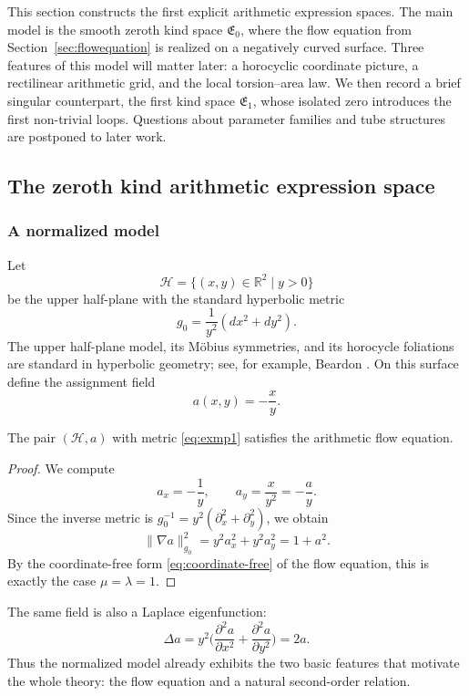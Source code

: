 This section constructs the first explicit arithmetic expression spaces. The main model is the smooth zeroth kind space $\mathfrak{E}_0$, where the flow equation from Section~\ref{sec:flowequation} is realized on a negatively curved surface. Three features of this model will matter later: a horocyclic coordinate picture, a rectilinear arithmetic grid, and the local torsion--area law. We then record a brief singular counterpart, the first kind space $\mathfrak{E}_1$, whose isolated zero introduces the first non-trivial loops. Questions about parameter families and tube structures are postponed to later work.

\subsection{The zeroth kind arithmetic expression space}\label{subsec:motivexamples}\label{subsec:generalframework}

\subsubsection{A normalized model}

Let
\[
\mathcal H = \{(x,y)\in\mathbb R^2\mid y>0\}
\]
be the upper half-plane with the standard hyperbolic metric
\begin{equation}\label{eq:exmp1}
    g_0 = \frac{1}{y^2}(dx^2+dy^2).
\end{equation}
The upper half-plane model, its Möbius symmetries, and its horocycle foliations are standard in hyperbolic geometry; see, for example, Beardon \cite{Beardon1983DiscreteGroups}. On this surface define the assignment field
\[
    a(x,y) = -\frac{x}{y}.
\]

\begin{proposition}\label{thm:exmp1}
The pair $(\mathcal H,a)$ with metric \eqref{eq:exmp1} satisfies the arithmetic flow equation.
\end{proposition}

\begin{proof}
We compute
\[
    a_x = -\frac{1}{y},
    \qquad
    a_y = \frac{x}{y^2} = -\frac{a}{y}.
\]
Since the inverse metric is $g_0^{-1}=y^2(\partial_x^2+\partial_y^2)$, we obtain
\[
    \|\nabla a\|_{g_0}^2
    = y^2 a_x^2 + y^2 a_y^2
    = 1 + a^2.
\]
By the coordinate-free form \eqref{eq:coordinate-free} of the flow equation, this is exactly the case $\mu=\lambda=1$.
\end{proof}

The same field is also a Laplace eigenfunction:
\[
    \Delta a = y^2\Big(\frac{\partial^2 a}{\partial x^2} + \frac{\partial^2 a}{\partial y^2}\Big) = 2a.
\]
Thus the normalized model already exhibits the two basic features that motivate the whole theory: the flow equation and a natural second-order relation.

